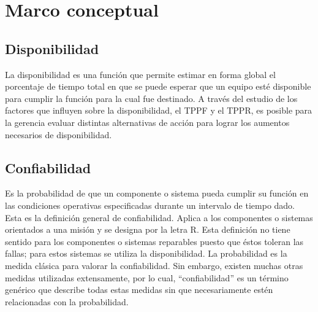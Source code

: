 \documentclass[]{article}
\begin{document}
\hypertarget{marco-conceptual-descripcion-detallada}{%
\section{Marco conceptual}
\label{marco-conceptual-descripcion-detallada}}

\subsection{Disponibilidad}


La disponibilidad es una función que permite estimar en forma global el porcentaje de tiempo total en que se puede esperar que un equipo esté disponible para cumplir la función para la cual fue destinado. A través del estudio de los factores que influyen sobre la disponibilidad, el TPPF y el TPPR, es posible para la gerencia evaluar distintas alternativas de acción para lograr los aumentos necesarios de disponibilidad.\cite{amendola2003indicadores}

\subsection{Confiabilidad}


Es la probabilidad de que un componente o sistema pueda cumplir su función en las condiciones operativas especificadas durante un intervalo de tiempo dado. Esta es la definición general de confiabilidad. Aplica a los componentes o sistemas orientados a una misión y se designa por la letra R. Esta definición no tiene sentido para los componentes o sistemas reparables puesto que éstos toleran las fallas; para estos sistemas se utiliza la disponibilidad.
La probabilidad es la medida clásica para valorar la confiabilidad. Sin embargo, existen muchas otras medidas utilizadas extensamente, por lo cual, “confiabilidad” es un término genérico que describe todas estas medidas sin que necesariamente estén relacionadas con la probabilidad.\cite{rios2014iso}
\end{document}
